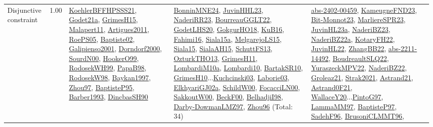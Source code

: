 {\begin{longtable}{p{3cm}r>{\raggedright\arraybackslash}p{6cm}>{\raggedright\arraybackslash}p{6cm}>{\raggedright\arraybackslash}p{8cm}}
\index{Disjunctive constraint}\index{Constraints!Disjunctive constraint}Disjunctive constraint &  1.00 & \hyperref[detail:KoehlerBFFHPSSS21]{KoehlerBFFHPSSS21}, \hyperref[detail:Godet21a]{Godet21a}, \hyperref[detail:GrimesH15]{GrimesH15}, \hyperref[detail:Malapert11]{Malapert11}, \hyperref[detail:Artigues2011]{Artigues2011}, \hyperref[detail:RoePS05]{RoePS05}, \hyperref[detail:Baptiste02]{Baptiste02}, \hyperref[detail:Galipienso2001]{Galipienso2001}, \hyperref[detail:Dorndorf2000]{Dorndorf2000}, \hyperref[detail:SourdN00]{SourdN00}, \hyperref[detail:HookerO99]{HookerO99}, \hyperref[detail:RodosekWH99]{RodosekWH99}, \hyperref[detail:PapaB98]{PapaB98}, \hyperref[detail:RodosekW98]{RodosekW98}, \hyperref[detail:Baykan1997]{Baykan1997}, \hyperref[detail:Zhou97]{Zhou97}, \hyperref[detail:BaptisteP95]{BaptisteP95}, \hyperref[detail:Barber1993]{Barber1993}, \hyperref[detail:DincbasSH90]{DincbasSH90} & \hyperref[detail:BonninMNE24]{BonninMNE24}, \hyperref[detail:JuvinHHL23]{JuvinHHL23}, \hyperref[detail:NaderiRR23]{NaderiRR23}, \hyperref[detail:BourreauGGLT22]{BourreauGGLT22}, \hyperref[detail:GodetLHS20]{GodetLHS20}, \hyperref[detail:GokgurHO18]{GokgurHO18}, \hyperref[detail:KuB16]{KuB16}, \hyperref[detail:Fahimi16]{Fahimi16}, \hyperref[detail:Siala15a]{Siala15a}, \hyperref[detail:MelgarejoLS15]{MelgarejoLS15}, \hyperref[detail:Siala15]{Siala15}, \hyperref[detail:SialaAH15]{SialaAH15}, \hyperref[detail:SchuttFS13]{SchuttFS13}, \hyperref[detail:OzturkTHO13]{OzturkTHO13}, \hyperref[detail:GrimesH11]{GrimesH11}, \hyperref[detail:LombardiM10a]{LombardiM10a}, \hyperref[detail:Lombardi10]{Lombardi10}, \hyperref[detail:BartakSR10]{BartakSR10}, \hyperref[detail:GrimesH10]{GrimesH10}...\hyperref[detail:Kuchcinski03]{Kuchcinski03}, \hyperref[detail:Laborie03]{Laborie03}, \hyperref[detail:ElkhyariGJ02a]{ElkhyariGJ02a}, \hyperref[detail:SchildW00]{SchildW00}, \hyperref[detail:FocacciLN00]{FocacciLN00}, \hyperref[detail:SakkoutW00]{SakkoutW00}, \hyperref[detail:BeckF00]{BeckF00}, \hyperref[detail:BelhadjiI98]{BelhadjiI98}, \hyperref[detail:Darby-DowmanLMZ97]{Darby-DowmanLMZ97}, \hyperref[detail:Zhou96]{Zhou96} (Total: 34) & \hyperref[detail:abs-2402-00459]{abs-2402-00459}, \hyperref[detail:KameugneFND23]{KameugneFND23}, \hyperref[detail:Bit-Monnot23]{Bit-Monnot23}, \hyperref[detail:MarliereSPR23]{MarliereSPR23}, \hyperref[detail:JuvinHL23a]{JuvinHL23a}, \hyperref[detail:NaderiBZ23]{NaderiBZ23}, \hyperref[detail:NaderiBZ22a]{NaderiBZ22a}, \hyperref[detail:KotaryFH22]{KotaryFH22}, \hyperref[detail:JuvinHL22]{JuvinHL22}, \hyperref[detail:ZhangBB22]{ZhangBB22}, \hyperref[detail:abs-2211-14492]{abs-2211-14492}, \hyperref[detail:BoudreaultSLQ22]{BoudreaultSLQ22}, \hyperref[detail:YuraszeckMPV22]{YuraszeckMPV22}, \hyperref[detail:NaderiBZ22]{NaderiBZ22}, \hyperref[detail:Groleaz21]{Groleaz21}, \hyperref[detail:Strak2021]{Strak2021}, \hyperref[detail:Astrand21]{Astrand21}, \hyperref[detail:Astrand0F21]{Astrand0F21}, \hyperref[detail:WallaceY20]{WallaceY20}...\hyperref[detail:PintoG97]{PintoG97}, \hyperref[detail:LammaMM97]{LammaMM97}, \hyperref[detail:BaptisteP97]{BaptisteP97}, \hyperref[detail:SadehF96]{SadehF96}, \hyperref[detail:BrusoniCLMMT96]{BrusoniCLMMT96}, 
\end{longtable}}
